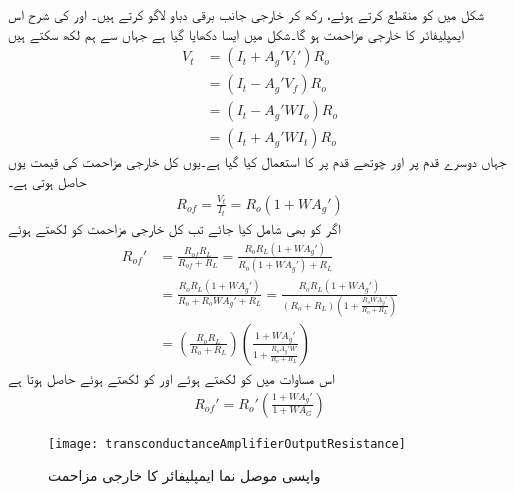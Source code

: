شکل  میں  کو منقطع کرتے ہوئے،  رکھ  کر خارجی جانب برقی دباو  لاگو کرتے ہیں۔ اور  کی شرح اس ایمپلیفائر کا خارجی مزاحمت  ہو گا۔شکل  میں ایسا دکھایا گیا ہے جہاں سے ہم لکھ سکتے ہیں
\begin{align*}
V_t &=\left (I_t+A_g' V_i' \right) R_o \\
&=\left (I_t-A_g' V_f \right) R_o \\
&=\left (I_t- A_g' W I_o \right) R_o \\
&=\left (I_t+ A_g' W I_t \right) R_o
\end{align*}
جہاں دوسرے قدم پر  اور چوتھے قدم پر  کا استعمال کیا گیا ہے۔یوں کل خارجی مزاحمت   کی قیمت یوں حاصل ہوتی ہے۔
\begin{align}
R_{of}=\frac{V_t}{I_t}=R_o \left (1+W A_g' \right )
\end{align}
اگر  کو بھی شامل کیا جائے تب کل خارجی مزاحمت کو  لکھتے ہوئے
\begin{align*}
R_{of}' &=\frac{R_{of} R_L}{R_{of}+R_L}=\frac{R_o R_L \left (1+W A_g' \right )}{R_o \left (1+W A_g' \right )+R_L}\\
&=\frac{R_o R_L \left (1+W A_g' \right )}{R_o +R_o W A_g' +R_L}=\frac{R_o R_L \left (1+W A_g' \right )}{ \left (R_o+R_L \right )\left(1+\frac{R_o W A_g'}{R_o+R_L} \right)} \\
&=\left (\frac{R_o R_L}{R_o+R_L} \right ) \left ( \frac{1+W A_g'}{1+\frac{R_o  A_g' W}{R_o+R_L}}\right )
\end{align*}
اس مساوات میں  کو  لکھتے ہوئے اور  کو  لکھتے ہوئے حاصل ہوتا ہے
\begin{align}
R_{of}'=R_o'  \left (\frac{1+W A_g'}{1+W A_G}\right )
\end{align}
%
\begin{figure}
\centering
\texttt{[image: transconductanceAmplifierOutputResistance]}
\caption{واپسی موصل نما ایمپلیفائر کا خارجی مزاحمت}
\label{شکل_واپسی_موصلیت_نما_ایمپلیفائر_خارجی_مزاحمت}
\end{figure}

